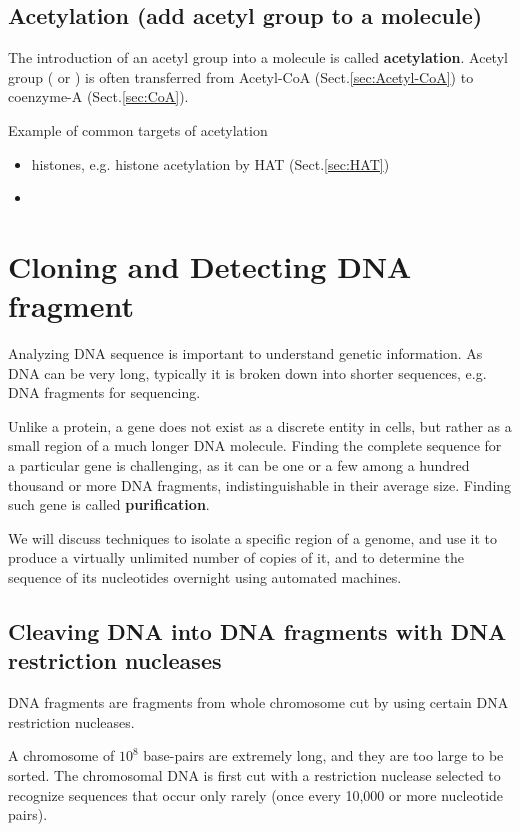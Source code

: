 \section{Acetylation (add acetyl group to a molecule)}
\label{sec:acetylation}

The introduction of an acetyl group into a molecule is called {\bf acetylation}.
Acetyl group ( or ) is often transferred from
Acetyl-CoA (Sect.\ref{sec:Acetyl-CoA}) to coenzyme-A (Sect.\ref{sec:CoA}).

Example of common targets of acetylation 
\begin{itemize}
  \item histones, e.g. histone acetylation by HAT (Sect.\ref{sec:HAT})
  
  \item 
\end{itemize}



\chapter{Cloning and Detecting DNA fragment}

Analyzing DNA sequence is important to understand genetic information.
As DNA can be very long, typically it is broken down into shorter sequences,
e.g. DNA fragments for sequencing. 

Unlike a protein, a gene does not exist as a discrete entity in cells, but
rather as a small region of a much longer DNA molecule. Finding the complete
sequence for a particular gene is challenging, as it can be one or a few among a
hundred thousand or more DNA fragments, indistinguishable in their average size.
Finding such gene is called {\bf purification}.

We will discuss techniques to isolate a specific region of a genome, and use it
to produce a virtually unlimited number of copies of it, and to determine the
sequence of its nucleotides overnight using automated machines.

\section{Cleaving DNA into DNA fragments with DNA restriction nucleases}
\label{sec:DNA-restriction-nucleases}

DNA fragments are fragments from whole chromosome cut by using certain DNA
restriction nucleases.
  
A chromosome of $10^8$ base-pairs are extremely long, and they are too large
  to be sorted.  The chromosomal DNA is first cut with a restriction nuclease
  selected to recognize sequences that occur only rarely (once every 10,000 or
  more nucleotide pairs). 
  
